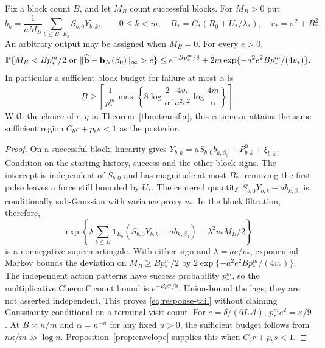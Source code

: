 \begin{theorem}
\label{thm:response-estimator}
Fix a block count $B$, and let $M_B$ count successful blocks. For $M_B>0$ put
\[
 \widehat b_k=\frac1{aM_B}\sum_{b\le B:\,E_b}S_{b,0}Y_{b,k},\qquad
 0\le k<m,\quad
 B_*=C_*(R_0+U_*/\lambda_*),\quad v_*=\sigma^2+B_*^2.
\]
An arbitrary output may be assigned when $M_B=0$. For every $e>0$,
\begin{equation}
 \mathbb P\{M_B<Bp_*^m/2\text{ or }
       \|\widehat{\mathbf b}-\mathbf b_N(\beta_0)\|_\infty>e\}
 \le e^{-Bp_*^m/8}+2m\exp\{-a^2e^2Bp_*^m/(4v_*)\}.
 \label{eq:response-tail}
\end{equation}
In particular a sufficient block budget for failure at most $\alpha$ is
\begin{equation}
 B\ge\left\lceil\frac1{p_*^m}
 \max\left\{8\log\frac2\alpha,
 \frac{4v_*}{a^2e^2}\log\frac{4m}\alpha\right\}\right\rceil.
 \label{eq:response-budget}
\end{equation}
With the choice of $e,\eta$ in Theorem~\ref{thm:transfer}, this estimator
attains the same sufficient region $C_b r+p_b s<1$ as the posterior.
\end{theorem}
\begin{proof}
On a successful block, linearity gives
$Y_{b,k}=aS_{b,0}b_{k,\beta_0}+P^0_{b,k}+\xi_{b,k}$.
Condition on the starting history, success and the other block signs.
The intercept is independent of $S_{b,0}$ and has magnitude at most $B_*$:
removing the first pulse leaves a force still bounded by $U_*$. The centered
quantity $S_{b,0}Y_{b,k}-ab_{k,\beta_0}$ is conditionally sub-Gaussian with
variance proxy $v_*$. In the block filtration, therefore,
\[
 \exp\left\{\lambda\sum_{b\le B}\mathbf1_{E_b}
 (S_{b,0}Y_{b,k}-ab_{k,\beta_0})-\lambda^2v_*M_B/2\right\}
\]
is a nonnegative supermartingale. With either sign and
$\lambda=ae/v_*$, exponential Markov bounds the deviation on
$M_B\ge Bp_*^m/2$ by $2\exp\{-a^2e^2Bp_*^m/(4v_*)\}$.
The independent action patterns have success probability $p_*^m$, so the
multiplicative Chernoff count bound is $e^{-Bp_*^m/8}$. Union-bound the lags;
they are not asserted independent. This proves \eqref{eq:response-tail}
without claiming Gaussianity conditional on a terminal visit count.
For $e=\delta/(6L\mathcal A)$, $p_*^me^2=\kappa/9$. At $B\asymp n/m$
and $\alpha=n^{-u}$ for any fixed $u>0$, the sufficient budget follows from
$n\kappa/m\gg\log n$. Proposition~\ref{prop:envelope} supplies this when
$C_b r+p_b s<1$.
\end{proof}

